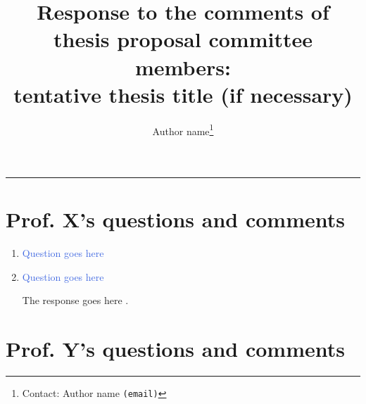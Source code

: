 \documentclass[12pt,letterpaper]{article}
\def\TitleFont{\Large}                      %
\numberwithin{equation}{section}        %
\newcommand{\question}{\textcolor{RoyalBlue}}
\theoremstyle{definition}
\begin{document}

\title{\vspace{-1.5\baselineskip} \TitleFont{Response to the comments of thesis proposal committee members: \\
tentative thesis title (if necessary)}}

\author[]{Author name\thanks{Contact: Author name \texttt{(email)}} } 


\date{}

\maketitle 

\vspace{-\baselineskip} \hrule


\section{Prof. X's questions and comments}

\begin{enumerate} [label=\textcolor{RoyalBlue}{\arabic*.},leftmargin=2.5\baselineskip, itemsep=0.5\baselineskip, parsep=\baselineskip]

\item \question{Question goes here}

\Blindtext[2]

\item \question{Question goes here}

The response goes here \cite{dirac}.



\end{enumerate}




\clearpage
\section{Prof. Y's questions and comments}
\end{document}
